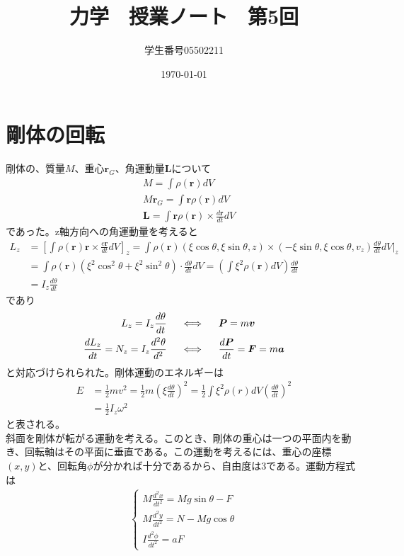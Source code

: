 \documentclass{jsarticle}
\title{力学　授業ノート　第5回}
\author{学生番号05502211}
\date{\today}
\begin{document}
\maketitle
\section{剛体の回転}
\noindent
剛体の、質量\(M\)、重心\(\bm{r}_{G}\)、角運動量\(\bm{L}\)について
\begin{align}
&M=\int\rho(\bm{r})dV\\\
&M\bm{r}_{G}=\int\bm{r}\rho(\bm{r})dV\\
&\bm{L}=\int\bm{r}\rho(\bm{r})\times\frac{d\bm{r}}{dt}dV
\end{align}
であった。z軸方向への角運動量を考えると
\begin{align*}
L_{z}&=\left[\int\rho(\bm{r})\bm{r}\times\frac{e\bm{r}}{dt}dV\right]_{z}=\int\rho(\bm{r})(\xi\cos\theta,\xi\sin\theta,z)\times(-\xi\sin\theta,\xi\cos\theta,v_{z})\frac{d\theta}{dt}dV\Bigg|_{z}\\
&=\int\rho(\bm{r})(\xi^{2}\cos^{2}\theta+\xi^{2}\sin^{2}\theta)\cdot\frac{d\theta}{dt}dV=\left(\int\xi^{2}\rho(\bm{r})dV\right)\frac{d\theta}{dt}\\
&=I_{z}\frac{d\theta}{dt}
\end{align*}
であり
\begin{align*}
L_{z}=I_{z}\frac{d\theta}{dt}\hspace{5mm}&\Longleftrightarrow\hspace{5mm}\bm{P}=m\bm{v}\\
\frac{dL_{z}}{dt}=N_{z}=I_{z}\frac{d^{2}\theta}{d^2}\hspace{5mm}&\Longleftrightarrow\hspace{5mm}\frac{d\bm{P}}{dt}=\bm{F}=m\bm{a}
\end{align*}
と対応づけられられた。剛体運動のエネルギーは
\begin{align}
E&=\frac{1}{2}mv^{2}=\frac{1}{2}m\left(\xi\frac{d\theta}{dt}\right)^{2}=\frac{1}{2}\int\xi^{2}\rho(r)dV\left(\frac{d\theta}{dt}\right)^{2}\nonumber\\
&=\frac{1}{2}I_{z}\omega^{2}
\end{align}
と表される。\\
\newpage
\noindent
斜面を剛体が転がる運動を考える。このとき、剛体の重心は一つの平面内を動き、回転軸はその平面に垂直である。この運動を考えるには、重心の座標\((x,y)\)と、回転角\(\phi\)が分かれば十分であるから、自由度は3である。運動方程式は
\begin{align}
\begin{cases}
\displaystyle M\frac{d^{2}x}{dt^{2}}=Mg\sin\theta-F\\
\displaystyle M\frac{d^{2}y}{dt^{2}}=N-Mg\cos\theta\\
\displaystyle I\frac{d^{2}\phi}{dt^{2}}=aF
\end{cases}
\end{align}
\end{document}
